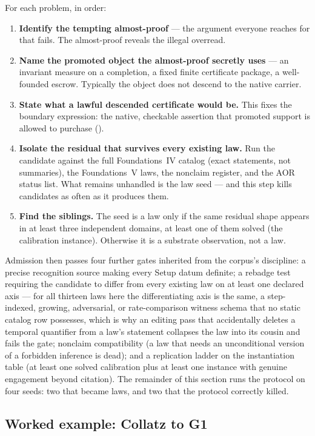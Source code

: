 \documentclass[11pt]{article}
\theoremstyle{definition}
\begin{document}
For each problem, in order:
\begin{enumerate}
  \item \textbf{Identify the tempting almost-proof} --- the argument everyone reaches for that fails.
    The almost-proof reveals the illegal overread.
  \item \textbf{Name the promoted object the almost-proof secretly uses} --- an invariant measure on a
    completion, a fixed finite certificate package, a well-founded escrow. Typically the object does
    not descend to the native carrier.
  \item \textbf{State what a lawful descended certificate would be.} This fixes the boundary
    expression: the native, checkable assertion that promoted support is allowed to purchase
    ().
  \item \textbf{Isolate the residual that survives every existing law.} Run the candidate against the
    full Foundations~IV catalog (exact statements, not summaries), the Foundations~V laws, the
    nonclaim register, and the AOR status list. What remains unhandled is the law seed --- and this
    step kills candidates as often as it produces them.
  \item \textbf{Find the siblings.} The seed is a law only if the same residual shape appears in at
    least three independent domains, at least one of them solved (the calibration instance).
    Otherwise it is a substrate observation, not a law.
\end{enumerate}
Admission then passes four further gates inherited from the corpus's discipline: a precise recognition
source making every Setup datum definite; a rebadge test requiring the candidate to differ from every
existing law on at least one declared axis --- for all thirteen laws here the differentiating axis is
the same, a step-indexed, growing, adversarial, or rate-comparison witness schema that no static
catalog row possesses, which is why an editing pass that accidentally deletes a temporal quantifier
from a law's statement collapses the law into its cousin and fails the gate; nonclaim compatibility
(a law that needs an unconditional version of a forbidden inference is dead); and a replication
ladder on the instantiation table (at least one solved calibration plus at least one instance with
genuine engagement beyond citation). The remainder of this section runs the protocol on four seeds:
two that became laws, and two that the protocol correctly killed.

\subsection*{Worked example: Collatz to G1}
\end{document}
